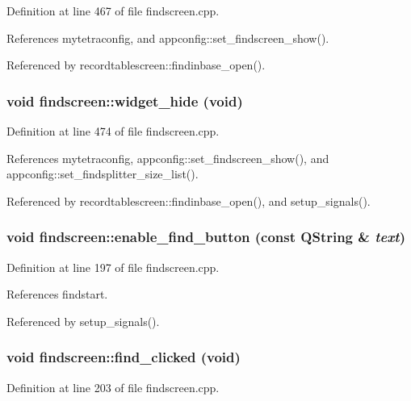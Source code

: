 Definition at line 467 of file findscreen.cpp.

References mytetraconfig, and appconfig::set\_\-findscreen\_\-show().

Referenced by recordtablescreen::findinbase\_\-open().
\subsubsection{\setlength{\rightskip}{0pt plus 5cm}void findscreen::widget\_\-hide (void)\hspace{0.3cm}{\tt  [slot]}}\label{classfindscreen_42187bda0c53a3dbc227da053ce000de}




Definition at line 474 of file findscreen.cpp.

References mytetraconfig, appconfig::set\_\-findscreen\_\-show(), and appconfig::set\_\-findsplitter\_\-size\_\-list().

Referenced by recordtablescreen::findinbase\_\-open(), and setup\_\-signals().
\subsubsection{\setlength{\rightskip}{0pt plus 5cm}void findscreen::enable\_\-find\_\-button (const QString \& {\em text})\hspace{0.3cm}{\tt  [private, slot]}}\label{classfindscreen_91bccab1ff4bffaf2e8ef3fd4dfe1733}




Definition at line 197 of file findscreen.cpp.

References findstart.

Referenced by setup\_\-signals().
\subsubsection{\setlength{\rightskip}{0pt plus 5cm}void findscreen::find\_\-clicked (void)\hspace{0.3cm}{\tt  [private, slot]}}\label{classfindscreen_53689f032782e0b3ef3537b5571d7da1}




Definition at line 203 of file findscreen.cpp.

